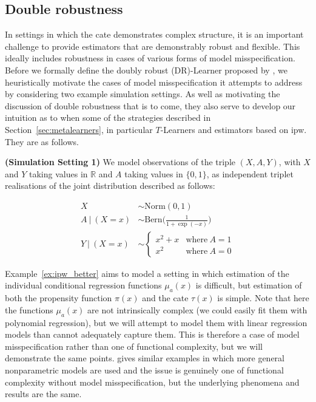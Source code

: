 \documentclass[../thesis.tex]{subfiles}
\begin{document}
\subsection{Double robustness} \label{sec:doublerobustness}
In settings in which the \gls{cate} demonstrates complex structure, it is an important challenge to provide estimators that are demonstrably robust and flexible. This ideally includes robustness in cases of various forms of model misspecification. Before we formally define the doubly robust (DR)-Learner proposed by \citet{kennedy_towards_2022}, we heuristically motivate the cases of model misspecification it attempts to address by considering two example simulation settings. As well as motivating the discussion of double robustness that is to come, they also serve to develop our intuition as to when some of the strategies described in Section~\ref{sec:metalearners}, in particular $T$-Learners and estimators based on \gls{ipw}. They are as follows.

\begin{example}{\textbf{(Simulation Setting 1)}} \label{ex:ipw_better}
We model observations of the triple $(X, A, Y)$, with $X$ and $Y$ taking values in $\mathbb{R}$ and $A$ taking values in $\{0,1\}$, as independent triplet realisations of the joint distribution described as follows:

\begin{align*}
X & \sim \mathrm{Norm}(0, 1) \\    
A \ | \ (X = x) & \sim \mathrm{Bern}\Big(\frac{1}{1 + \exp(-x)}\Big) \\ 
Y \ | \ (X = x) & \sim \begin{cases}
      x^2 + x & \text{where} \ A = 1\\
      x^2 & \text{where} \ A = 0
    \end{cases}
\end{align*}
\end{example}

Example~\ref{ex:ipw_better} aims to model a setting in which estimation of the individual conditional regression functions $\mu_a(x)$ is difficult, but estimation of both the propensity function $\pi(x)$ and the \gls{cate} $\tau(x)$ is simple. Note that here the functions $\mu_a(x)$ are not intrinsically complex (we could easily fit them with polynomial regression), but we will attempt to model them with linear regression models than cannot adequately capture them. This is therefore a case of model misspecification rather than one of functional complexity, but we will demonstrate the same points. \citet{kennedy_towards_2022} gives similar examples in which more general nonparametric models are used and the issue is genuinely one of functional complexity without model misspecification, but the underlying phenomena and results are the same.
\end{document}
